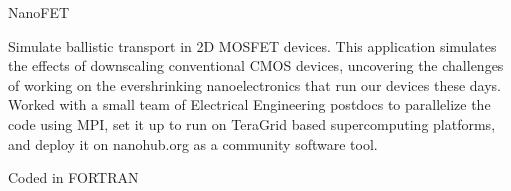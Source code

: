 \documentclass[10pt]{article}
\begin{document}
\begin{outerlist}
\begin{innerlist}
\begin{innerlist}
\begin{innerlist}
                            \item[] 
                        \end{innerlist}
                    \item[] NanoFET
                        \begin{innerlist}
                            \item[] Simulate ballistic transport in 2D MOSFET
                              devices. This application simulates the effects
                              of downscaling conventional CMOS devices,
                              uncovering the challenges of working on the
                              evershrinking nanoelectronics that run our
                              devices these days. Worked with a small team of
                              Electrical Engineering postdocs to parallelize
                              the code using MPI, set it up to run on TeraGrid
                              based supercomputing platforms, and deploy it
                              on nanohub.org as a community software tool.
                            \item[] Coded in FORTRAN
                            \item[] 
                        \end{innerlist}
                \end{innerlist}


\end{innerlist}
\end{outerlist}
\end{document}
